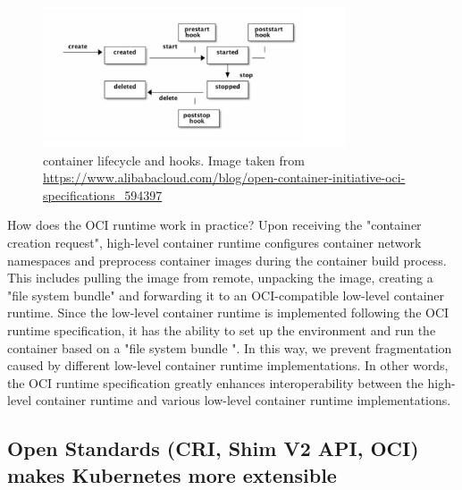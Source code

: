 \begin{figure}[tbp]
  \centering
  \includegraphics[width=0.8\textwidth]{images/Container_Lifecycle_state}
  \caption[Short description]{container lifecycle and hooks. Image taken from \url{https://www.alibabacloud.com/blog/open-container-initiative-oci-specifications_594397}}
  \label{fig:Container_Lifecycle_state}
\end{figure}
How does the OCI runtime work in practice? Upon receiving the "container creation request", high-level container runtime configures container network namespaces and preprocess container images during the container build process. This includes 
pulling the image from remote, unpacking the image, 
creating a "file system bundle" and forwarding it to an OCI-compatible low-level container runtime. Since the low-level container runtime is implemented following the OCI runtime specification,  it has the ability to set up the environment and run 
the container based on a "file system bundle ". In this way,  we prevent fragmentation caused by different low-level container runtime implementations.  In other words, the OCI runtime specification greatly enhances interoperability between the 
high-level container runtime and various low-level container runtime implementations.



\subsection{Open Standards (CRI\cite*{cri-interface}, Shim V2 API, OCI\cite*{oci-spec}) makes Kubernetes more extensible}
